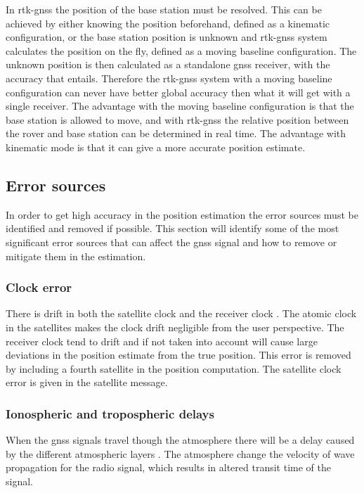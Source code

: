In \gls{rtk-gnss} the position of the base station must be resolved. This can be achieved by either knowing the position beforehand, defined as a kinematic configuration, or the base station position is unknown and \gls{rtk-gnss} system calculates the position on the fly, defined as a moving baseline configuration. The unknown position is then calculated as a standalone \gls{gnss} receiver, with the accuracy that entails. Therefore the \gls{rtk-gnss} system with a moving baseline configuration can never have better global accuracy then what it will get with a single receiver. The advantage with the moving baseline configuration is that the base station is allowed to move, and with \gls{rtk-gnss} the relative position between the rover and base station can be determined in real time. The advantage with kinematic mode is that it can give a more accurate position estimate.
\subsection{Error sources}
In order to get high accuracy in the position estimation the error sources must be identified and removed if possible. This section will identify some of the most significant error sources that can affect the \gls{gnss} signal and how to remove or mitigate them in the estimation.
\subsubsection{Clock error}
There is drift in both the satellite clock and the receiver clock \citep{misra2011global}. The atomic clock in the satellites makes the clock drift negligible from the user perspective. The receiver clock tend to drift and if not taken into account will cause large deviations in the position estimate from the true position. This error is removed by including a fourth satellite in the position computation. The satellite clock error is given in the satellite message.
\subsubsection{Ionospheric and tropospheric delays}\label{Ss:Atmosphere}
When the \gls{gnss} signals travel though the atmosphere there will be a delay caused by the different atmospheric layers \citep{misra2011global}. The atmosphere change the velocity of wave propagation for the radio signal, which results in altered transit time of the signal.

